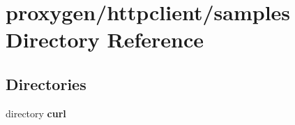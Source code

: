 \section{proxygen/httpclient/samples Directory Reference}
\label{dir_11dfcdba91e847f84825d6bf2ec40790}
\subsection*{Directories}
\begin{DoxyCompactItemize}
\item 
directory {\bf curl}
\end{DoxyCompactItemize}
